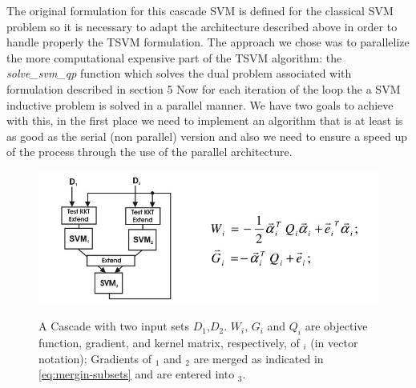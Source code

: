 The original formulation for this cascade SVM is defined for the classical
SVM problem so it is necessary to adapt the architecture described
above in order to handle properly the TSVM formulation. 
The approach we chose was to  parallelize the more computational expensive
part of the TSVM algorithm: the \emph{solve\_svm\_qp} function which
solves the dual problem associated with formulation described in section 5 %
Now for each iteration of the loop the a SVM inductive problem is solved in a parallel manner. We
have two goals to achieve with this, in the first place we need to
implement an algorithm that is at least is as good as the serial (non
parallel) version and also we need to ensure a speed up of the process
through the use of the parallel architecture.
%
\begin{figure}
\begin{centering}
\includegraphics[scale=0.35]{images/graf-svm-cascade-of-3}\label{fig:graf-3-svm}
\par\end{centering}
\begin{centering}
\caption{A Cascade with two input sets $D_{1}$,$D_{2}$. $W_{i}$, $G_{i}$
and $Q_{i}$ are objective function, gradient, and kernel matrix,
respectively, of $_{i}$ (in vector notation); Gradients
of $_{1}$ and $_{2}$ are merged as indicated
in \ref{eq:mergin-subsets} and are entered into $_{3}$.
\cite{GrafCBDV04}}
\par\end{centering}
\end{figure}
%
